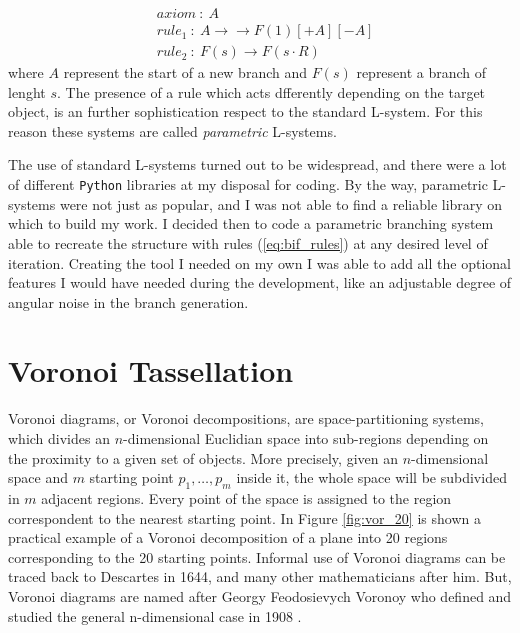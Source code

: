    \begin{align}
        & axiom\ :\ A \label{eq:bif_rules} \\
        & rule_1\ :\ A \rightarrow → F(1)[+A][-A] \nonumber \\
        & rule_2\ :\ F(s) \rightarrow F(s\cdot R) \nonumber
    \end{align}
    where $A$ represent the start of a new branch  and $F(s)$ represent a branch of lenght $s$. The presence of a rule which acts dfferently depending on the target object, is an further sophistication respect to the standard L-system. For this reason these systems are called \textit{parametric} L-systems.

    The use of standard L-systems turned out to be widespread, and there were a lot of different \texttt{Python} libraries at my disposal for coding. By the way, parametric L-systems were not just as popular, and I was not able to find a reliable library on which to build my work. I decided then to code a parametric branching system able to recreate the structure with rules (\ref{eq:bif_rules}) at any desired level of iteration. Creating the tool I needed on my own I was able to add all the optional features I would have needed during the development, like an adjustable degree of angular noise in the branch generation.

\section{Voronoi Tassellation} \label{ssec:vor_tass}
    Voronoi diagrams, or Voronoi decompositions, are space-partitioning systems, which divides an $n$-dimensional Euclidian space into sub-regions depending on the proximity to a given set of objects. More precisely, given an $n$-dimensional space and $m$ starting point $p_1,\dots, p_m$ inside it, the whole space will be subdivided in $m$ adjacent regions. Every point of the space is assigned to the region correspondent to the nearest starting point. In Figure \ref{fig:vor_20} is shown a practical example of a Voronoi decomposition of a plane into 20 regions corresponding to the 20 starting points. Informal use of Voronoi diagrams can be traced back to Descartes in 1644, and many other mathematicians after him. But, Voronoi diagrams are named after Georgy Feodosievych Voronoy who defined and studied the general n-dimensional case in 1908 \cite{VoronoiNouvellesAD}.

